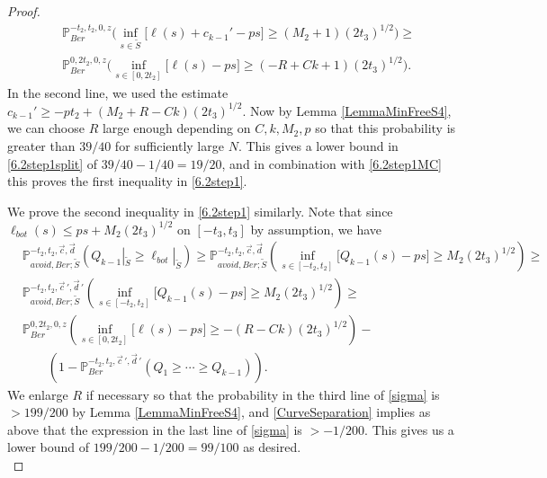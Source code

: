 \begin{proof}
	\begin{align*}
	&\mathbb{P}^{-t_2, t_2, 0, z}_{Ber}\Big(\inf_{s\in \tilde S}\big[\ell(s) + c_{k-1}' - ps\big]  \geq (M_2 + 1)(2t_3)^{1/2}\Big) \geq \\
	& \mathbb{P}^{0, 2t_2, 0, z}_{Ber}\Big(\inf_{s\in [0,2t_2]}\big[\ell(s) - ps\big] \geq (-R+Ck+1)(2t_3)^{1/2}\Big).
	\end{align*}
	In the second line, we used the estimate $c_{k-1}' \geq -pt_2 + (M_2+R-Ck)(2t_3)^{1/2}$. Now by Lemma \ref{LemmaMinFreeS4}, we can choose $R$ large enough depending on $C,k,M_2,p$ so that this probability is greater than $39/40$ for sufficiently large $N$. This gives a lower bound in \eqref{6.2step1split} of $39/40-1/40 = 19/20$, and in combination with \eqref{6.2step1MC} this proves the first inequality in \eqref{6.2step1}.
	
	We prove the second inequality in \eqref{6.2step1} similarly. Note that since $\ell_{bot}(s) \leq ps + M_2(2t_3)^{1/2}$ on $[-t_3,t_3]$ by assumption, we have
	\begin{equation} \label{sigma}
	\begin{split}
	&\mathbb{P}^{-t_2,t_2,\vec{c},\vec{d}}_{avoid,Ber;\tilde S}\left(Q_{k-1}|_{\tilde S} \geq \ell_{bot}|_{\tilde S}\right) \geq \mathbb{P}^{-t_2, t_2, \vec{c},\vec{d}}_{avoid, Ber; \tilde S}\left(\inf_{s\in[-t_2, t_2]} \big[Q_{k-1}(s) - ps\big] \geq M_2(2t_3)^{1/2}\right) \geq\\
	&\mathbb{P}^{-t_2, t_2, \vec{c}\,',\vec{d}\,'}_{avoid, Ber;\tilde S}\left(\inf_{s\in[-t_2, t_2]} \big[Q_{k-1}(s) - ps\big] \geq M_2(2t_3)^{1/2}\right) \geq\\
	&\mathbb{P}^{0, 2t_2, 0, z}_{Ber}\left(\inf_{s\in[0, 2t_2]} \big[\ell(s) - ps\big] \geq -(R-Ck)(2t_3)^{1/2}\right) - \\
	&\qquad \left(1 - \mathbb{P}^{-t_2,t_2,\vec{c}\,',\vec{d}\,'}_{Ber}(Q_1\geq \cdots \geq Q_{k-1})\right).
	\end{split}
	\end{equation}
	We enlarge $R$ if necessary so that the probability in the third line of \eqref{sigma} is $>199/200$ by Lemma \ref{LemmaMinFreeS4}, and \ref{CurveSeparation} implies as above that the expression in the last line of \eqref{sigma} is $>-1/200$. This gives us a lower bound of $199/200 - 1/200 = 99/100$ as desired.\\
	

\end{proof}
